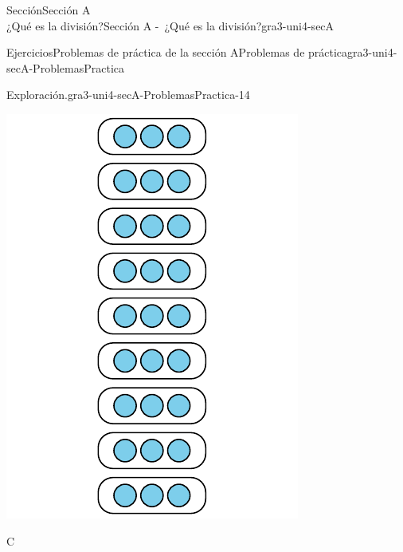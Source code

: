 \begin{sectionptx}{Sección}{{\Large Sección A\\}¿Qué es la división?}{}{Sección A -~¿Qué es la división?}{}{}{gra3-uni4-secA}
\begin{exercises-subsection}{Ejercicios}{Problemas de práctica de la sección A}{}{Problemas de práctica}{}{}{gra3-uni4-secA-ProblemasPractica}
\begin{divisionexercise}{12}{Exploración.}{}{gra3-uni4-secA-ProblemasPractica-14}
\begin{sidebyside}{3}{0}{0}{0.02}
\begin{sbspanel}{0.32}
\includegraphics[max width=\linewidth, center]{external/svg-source/tikz-file-151675.pdf}
\end{sbspanel}%
\begin{sbspanel}{0.32}%
C%
\par

\end{sbspanel}
\end{sidebyside}
\end{divisionexercise}
\end{exercises-subsection}
\end{sectionptx}
